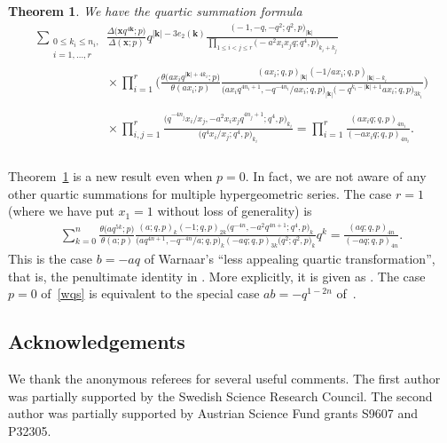 \documentclass[pdftex]{sigma}%
\numberwithin{equation}{section}
\newtheorem{Theorem}{Theorem}[section]
\def\ta{\theta}
\newcommand\bk{\mathbf k}
\newcommand\bx{\mathbf x}
\begin{document}
\begin{Theorem}\label{cqust}
We have the quartic summation formula
\begin{gather*}
\sum_{\substack{0\leq k_i\leq n_i,\\ i=1,\dots,r}}
\frac{\Delta\big(\bx q^{4\bk};p\big)}{\Delta(\bx;p)}
q^{|\bk|-3e_2(\bk)}
\frac {\big({-}1,-q,-q^2;q^2,p\big)_{|\bk|}}{\prod\limits_{1\le i<j\le r}\big({-}a^2x_ix_jq;q^4,p\big) _{k_i+k_j}}
\\ \phantom{\sum_{\substack{0\leq k_i\leq n_i,\\ i=1,\dots,r}}}{}
\times
\prod\limits_{i=1}^{r}\bigg(\frac{\ta\big(ax_iq^{|\bk|+4k_i};p\big)}{\ta(ax_i;p)}
\frac {(ax_i;q,p)_{|\bk|} (-1/ax_i;q,p)_{|\bk|-k_i}}
{\big(ax_iq^{4n_i+1},-q^{-4n_i}/ax_i;q,p\big)_{|\bk|}\big({-}q^{k_i-|\bk|+1}ax_i;q,p\big)_{3k_i}}\bigg)
\\ \phantom{\sum_{\substack{0\leq k_i\leq n_i,\\ i=1,\dots,r}}}{}
\times
\prod\limits_{i,j=1} ^{r}\frac{\big(q^{-4n_j}x_i/x_j,-a^2x_ix_jq^{4n_j+1};q^4,p\big)_{k_i}}
{\big(q^4x_i/x_j;q^4,p\big)_{k_i}}
=\prod\limits_{i=1} ^{r}\frac{(ax_iq;q,p)_{4n_i}}
{(-ax_iq;q,p)_{4n_i}}.
\end{gather*}
\end{Theorem}

Theorem~\ref{cqust} is a new result even when $p=0$. In fact, we are not aware of any other quartic summations for multiple hypergeometric series. The case $r=1$ (where we have put $x_1=1$ without loss of generality) is
\begin{gather}\label{wqs}
\sum_{k=0}^n\frac{\theta\big(aq^{5k};p\big)}{\theta(a;p)}
\frac{(a;q,p)_k(-1;q,p)_{2k}\big(q^{-4n},-a^2q^{4n+1};q^4,p\big)_k}
{\big(aq^{4n+1},-q^{-4n}/a;q,p\big)_k(-aq;q,p)_{3k}\big(q^2;q^2,p\big)_k} q^k
=\frac{(aq;q,p)_{4n}}{(-aq;q,p)_{4n}}.
\end{gather}
This is the case $b=-aq$ of Warnaar's ``less appealing quartic transformation'', that is, the penultimate identity in \cite{w}. More explicitly, it is given as \cite[Corollary~2.5]{cj}. The case $p=0$ of~\eqref{wqs} is equivalent to the special case $ab=-q^{1-2n}$ of~\cite[equation~(5.28)]{g}.

\subsection*{Acknowledgements}
We thank the anonymous referees for several useful comments.
The first author was partially supported by the Swedish Science Research Council.
The second author was partially supported by Austrian
Science Fund grants S9607 and P32305.
\end{document}
